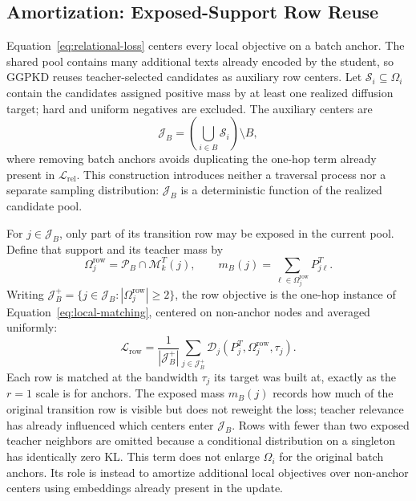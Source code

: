 \subsection{Amortization: Exposed-Support Row Reuse}

Equation~\eqref{eq:relational-loss} centers every local objective on a batch anchor. The shared pool contains many additional texts already encoded by the student, so GGPKD reuses teacher-selected candidates as auxiliary row centers. Let $\mathcal S_i\subseteq\Omega_i$ contain the candidates assigned positive mass by at least one realized diffusion target; hard and uniform negatives are excluded. The auxiliary centers are
\begin{equation}
\mathcal J_B
=\left(\bigcup_{i\in B}\mathcal S_i\right)\setminus B,
\end{equation}
where removing batch anchors avoids duplicating the one-hop term already present in $\mathcal L_{\mathrm{rel}}$. This construction introduces neither a traversal process nor a separate sampling distribution: $\mathcal J_B$ is a deterministic function of the realized candidate pool.

For $j\in\mathcal J_B$, only part of its transition row may be exposed in the current pool. Define that support and its teacher mass by
\begin{equation}
\Omega_j^{\mathrm{row}}
=\mathcal P_B\cap\mathcal M_k^T(j),
\qquad
m_B(j)=\sum_{\ell\in\Omega_j^{\mathrm{row}}}P_{j\ell}^T.
\end{equation}
Writing $\mathcal J_B^+=\{j\in\mathcal J_B:|\Omega_j^{\mathrm{row}}|\geq2\}$, the row objective is the one-hop instance of Equation~\eqref{eq:local-matching}, centered on non-anchor nodes and averaged uniformly:
\begin{equation}
\mathcal L_{\mathrm{row}}
=\frac{1}{|\mathcal J_B^+|}
\sum_{j\in\mathcal J_B^+}
\mathcal D_j\!\left(P_j^T,\Omega_j^{\mathrm{row}},\tau_j\right).
\label{eq:row-loss}
\end{equation}
Each row is matched at the bandwidth $\tau_j$ its target was built at, exactly as the $r=1$ scale is for anchors.
The exposed mass $m_B(j)$ records how much of the original transition row is visible but does not reweight the loss; teacher relevance has already influenced which centers enter $\mathcal J_B$. Rows with fewer than two exposed teacher neighbors are omitted because a conditional distribution on a singleton has identically zero KL. This term does not enlarge $\Omega_i$ for the original batch anchors. Its role is instead to amortize additional local objectives over non-anchor centers using embeddings already present in the update.

